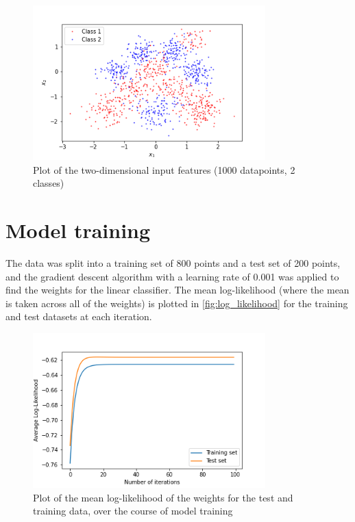 \documentclass[a4paper]{article}
\begin{document}
    \begin{figure}[h]
        \label{fig:data}
        \centering
        \includegraphics[width=0.8\textwidth]{plots/data.png}
        \caption{Plot of the two-dimensional input features (1000 datapoints, 2 classes)}
    \end{figure}

    \section{Model training}\label{sec:model-training}
    The data was split into a training set of 800 points and a test set of 200 points, and the gradient descent
    algorithm with a learning rate of 0.001 was applied to find the weights for the linear classifier. The mean
    log-likelihood (where the mean is taken across all of the weights) is plotted in \autoref{fig:log_likelihood} for
    the training and test datasets at each iteration.

    \begin{figure}[h]
        \label{fig:log_likelihood}
        \centering
        \includegraphics[width=0.8\textwidth]{plots/log_likelihood.png}
        \caption{Plot of the mean log-likelihood of the weights for the test and training data, over the
        course of model training}
    \end{figure}
\end{document}
